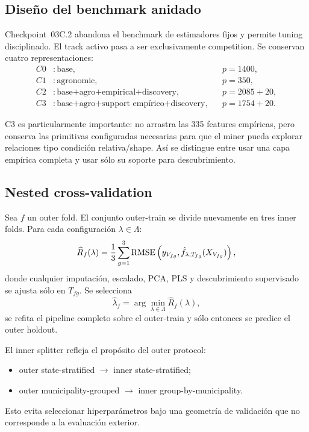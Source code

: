 \subsection{Diseño del benchmark anidado}

Checkpoint~03C.2 abandona el benchmark de estimadores fijos y permite tuning disciplinado.
El track activo pasa a ser exclusivamente competition. Se conservan cuatro representaciones:
\begin{align*}
C0 &: \text{base}, && p=1400,\\
C1 &: \text{agronomic}, && p=350,\\
C2 &: \text{base+agro+empirical+discovery}, && p=2085+20,\\
C3 &: \text{base+agro+support empírico+discovery}, && p=1754+20.
\end{align*}

C3 es particularmente importante: no arrastra las 335 features empíricas, pero conserva las
primitivas configuradas necesarias para que el miner pueda explorar relaciones tipo
condición relativa/shape. Así se distingue entre usar una capa empírica completa y usar sólo
su soporte para descubrimiento.

\subsection{Nested cross-validation}

Sea $f$ un outer fold. El conjunto outer-train se divide nuevamente en tres inner folds.
Para cada configuración $\lambda\in\Lambda$:
\[
\widehat R_f(\lambda)
=
\frac{1}{3}\sum_{g=1}^{3}
\operatorname{RMSE}\left(
y_{V_{fg}},
\hat f_{\lambda,T_{fg}}(X_{V_{fg}})
\right),
\]
donde cualquier imputación, escalado, PCA, PLS y descubrimiento supervisado se ajusta sólo en
$T_{fg}$. Se selecciona
\[
\hat\lambda_f
=
\arg\min_{\lambda\in\Lambda}\widehat R_f(\lambda),
\]
se refita el pipeline completo sobre el outer-train y sólo entonces se predice el outer
holdout.

El inner splitter refleja el propósito del outer protocol:
\begin{itemize}
\item outer state-stratified $\rightarrow$ inner state-stratified;
\item outer municipality-grouped $\rightarrow$ inner group-by-municipality.
\end{itemize}
Esto evita seleccionar hiperparámetros bajo una geometría de validación que no corresponde a
la evaluación exterior.

